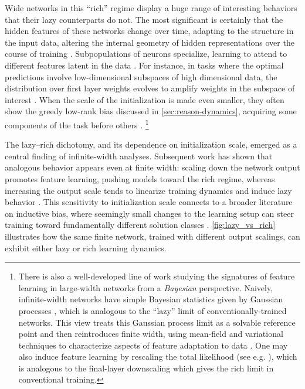 Wide networks in this ``rich'' regime display a huge range of interesting behaviors that their lazy counterparts do not.
The most significant is certainly that the hidden features of these networks change over time, adapting to the structure in the input data, altering the internal geometry of hidden representations over the course of training \citep{bordelon2022self}.
Subpopulations of neurons specialize, learning to attend to different features latent in the data \citep{aubin2018committee, goldt2019dynamics, ren2025emergence}.
For instance, in tasks where the optimal predictions involve low-dimensional subspaces of high dimensional data, the distribution over first layer weights evolves to amplify weights in the subspace of interest \citep{mei2018mean, abbe2022merged, moniri2023theory, cui2024asymptotics, defilippis2025scaling, erba2025nuclear, montanari2026phase}.
When the scale of the initialization is made even smaller, they often show the greedy low-rank bias discussed in \cref{sec:reason-dynamics}, acquiring some components of the task before others \citep{saxe2015deep,atanasov2021neural,atanasovoptimization}.%
\footnote{
There is also a well-developed line of work studying the signatures of feature learning in large-width networks from a \textit{Bayesian} perspective.
Naively, infinite-width networks have simple Bayesian statistics given by Gaussian processes \citep{lee2017deep}, which is analogous to the ``lazy'' limit of conventionally-trained networks.
This view treats this Gaussian process limit as a solvable reference point \citep{cohen2021learning,lavie2024towards} and then reintroduces finite width, using mean-field and variational techniques to characterize aspects of feature adaptation to data \citep{cohen2021learning,seroussi2023separation,rubin2023grokking,rubin2025kernels,rubin2025mitigating}.
One may also induce feature learning by rescaling the total likelihood (see e.g. \citet{yang2023theory}), which is analogous to the final-layer downscaling which gives the rich limit in conventional training.
}


The lazy–rich dichotomy, and its dependence on initialization scale, emerged as a central finding of infinite-width analyses.
Subsequent work has shown that analogous behavior appears even at finite width: scaling down the network output promotes feature learning, pushing models toward the rich regime, whereas increasing the output scale tends to linearize training dynamics and induce lazy behavior \citep{chizat2019lazy}.
This sensitivity to initialization scale connects to a broader literature on inductive bias, where seemingly small changes to the learning setup can steer training toward fundamentally different solution classes \citep{maennel2018gradient,woodworth2020kernel}.
\cref{fig:lazy_vs_rich} illustrates how the same finite network, trained with different output scalings, can exhibit either lazy or rich learning dynamics.




